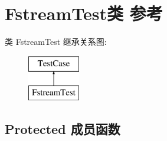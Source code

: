 \hypertarget{class_fstream_test}{}\section{Fstream\+Test类 参考}
\label{class_fstream_test}
类 Fstream\+Test 继承关系图\+:\begin{figure}[H]
\begin{center}
\leavevmode
\includegraphics[height=2.000000cm]{class_fstream_test}
\end{center}
\end{figure}
\subsection*{Protected 成员函数}
